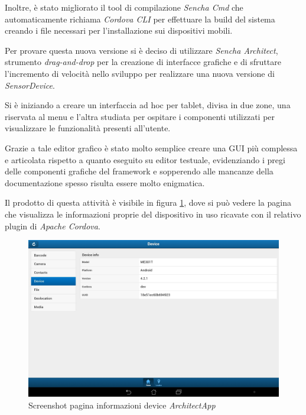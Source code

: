 Inoltre, è stato migliorato il tool di compilazione \emph{Sencha Cmd} che automaticamente richiama \emph{Cordova \ac{CLI}} per effettuare la build del sistema creando i file necessari per l'installazione sui dispositivi mobili.

Per provare questa nuova versione si è deciso di utilizzare \emph{Sencha Architect}, strumento \emph{drag-and-drop} per la creazione di interfacce grafiche e di sfruttare l'incremento di velocità nello sviluppo per realizzare una nuova versione di \emph{SensorDevice}.

Si è iniziando a creare un interfaccia ad hoc per tablet, divisa in due zone, una riservata al menu e l'altra studiata per ospitare i componenti utilizzati per visualizzare le funzionalità presenti all'utente.

Grazie a tale editor grafico è stato molto semplice creare una \ac{GUI} più complessa e articolata rispetto a quanto eseguito su editor testuale, evidenziando i pregi delle componenti grafiche del framework e sopperendo alle mancanze della documentazione spesso risulta essere molto enigmatica.

Il prodotto di questa attività è visibile in figura \ref{fig:screenshot device architect}, dove si può vedere la pagina che visualizza le informazioni proprie del dispositivo in uso ricavate con il relativo plugin di \emph{Apache Cordova}.

\begin{figure}[htb]
\centering
\includegraphics[scale=0.25]{gfx/screenshot/screen_device_architect}
\caption{Screenshot pagina informazioni device \emph{ArchitectApp}}
\label{fig:screenshot device architect}
\end{figure}